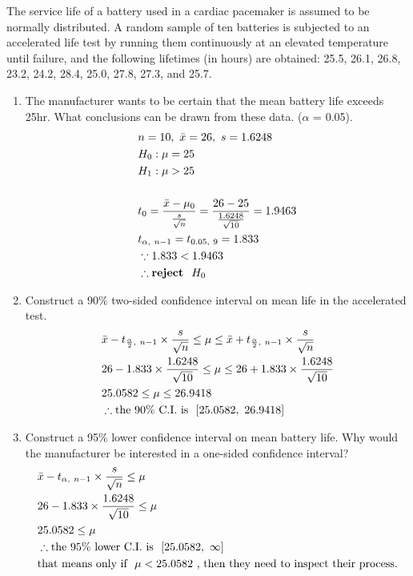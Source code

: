 The service life of a battery used in a cardiac pacemaker is assumed to be normally distributed. A random sample of ten batteries is subjected to an accelerated life test by running them continuously at an elevated temperature until failure, and the following lifetimes (in hours) are obtained: 25.5, 26.1, 26.8, 23.2, 24.2, 28.4, 25.0, 27.8, 27.3, and 25.7.

\begin{enumerate}
    \item The manufacturer wants to be certain that the mean battery life exceeds 25hr. What conclusions can be drawn from these data. ($\alpha$ = 0.05).
        \begin{align*}
            &n = 10, \ \Bar{x} = 26, \ s = 1.6248 \\
            &H_0: \mu = 25 \\
            &H_1: \mu > 25 \\
            & \\
            &t_0 = \frac{\Bar{x} - \mu_0}{\frac{s}{\sqrt{n}}} = \frac{26 - 25}{\frac{1.6248}{\sqrt{10}}} = 1.9463 \\
            &t_{\alpha, \ n-1} = t_{0.05, \ 9} = 1.833 \\
            &\because 1.833 < 1.9463\\
            &\therefore \textbf{reject } \ H_0 
        \end{align*}
        
    \item Construct a 90\% two-sided confidence interval on mean life in the accelerated test.
        \begin{align*}
            &\Bar{x} - t_{\frac{\alpha}{2}, \ n-1} \times \frac{s}{\sqrt{n}} \leq \mu \leq \Bar{x} + t_{\frac{\alpha}{2}, \ n-1} \times \frac{s}{\sqrt{n}} \\
            &26 - 1.833 \times \frac{1.6248}{\sqrt{10}} \leq \mu \leq 26 + 1.833 \times \frac{1.6248}{\sqrt{10}} \\
            &25.0582 \leq \mu \leq 26.9418 \\
            &\therefore \text{the 90\% C.I. is } \ [25.0582, \ 26.9418]
        \end{align*}
        
    \item Construct a 95\% lower confidence interval on mean battery life. Why would the manufacturer be interested in a one-sided confidence interval?
        \begin{align*}
            &\Bar{x} - t_{\alpha, \ n-1} \times \frac{s}{\sqrt{n}} \leq \mu \\
            &26 - 1.833 \times \frac{1.6248}{\sqrt{10}} \leq \mu \\
            &25.0582 \leq \mu \\
            &\therefore \text{the 95\% lower C.I. is } \ [25.0582, \ \infty]\\
            &\text{that means only if } \  \mu < 25.0582 \ \text{, then they need to inspect their process.}
        \end{align*}
        
\end{enumerate}
